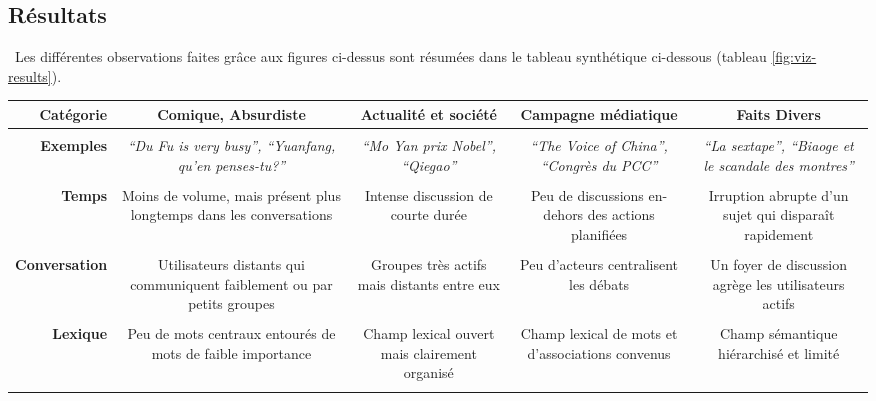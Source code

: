 \subsection[Résumé des résultats]{Résultats}
\
Les différentes observations faites grâce aux figures ci-dessus sont résumées dans le tableau synthétique ci-dessous (tableau \ref{fig:viz-results}).

{\small
\begin{table}[h!]
    \begin{tabulary}{\linewidth}{ r | C C C C}
        \textbf{Catégorie} & 
        \textbf{Comique, Absurdiste} &
        \textbf{Actualité et société}  &
        \textbf{Campagne médiatique} &
        \textbf{Faits Divers}  \\
        \hline \\[-1.2ex]

        \textbf{Exemples} & 
        \textit{``Du Fu is very busy'', ``Yuanfang, qu'en penses-tu?''} &
        \textit{``Mo Yan prix Nobel'', ``Qiegao''} &
        \textit{``The Voice of China'', ``Congrès du PCC''} &
        \textit{``La sextape'', ``Biaoge et le scandale des montres''} \\
        \hline \\[-1.2ex]

        \textbf{Temps} & 
        Moins de volume, mais présent  plus longtemps dans les conversations &
        Intense discussion de courte durée &
        Peu de discussions en-dehors des actions planifiées &
        Irruption abrupte d'un sujet qui disparaît rapidement \\
        \hline \\[-1.2ex]

        \textbf{Conversation} &  
        Utilisateurs distants qui communiquent faiblement ou par petits groupes &
        Groupes très actifs mais distants entre eux  &
        Peu d{\textquoteright}acteurs centralisent les débats &
        Un foyer de discussion agrège les utilisateurs actifs \\
        \hline \\[-1.2ex]

        \textbf{Lexique} &
        Peu de mots centraux entourés de mots de faible importance &
        Champ lexical ouvert mais clairement organisé &
        Champ lexical de mots et d'associations convenus  &
        Champ sémantique hiérarchisé et limité \\
        \hline \\[-1.2ex]


\end{tabulary}
\end{table}}
